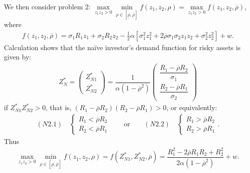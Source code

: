 \documentclass[10pt]{article}
\begin{document}
We then consider problem 2: $ \max\limits_{z_1 z_2 > 0} \min\limits_{\rho \in [\underline{\rho}, \overline{\rho}]} f (z_1, z_2, \rho) = \max\limits_{z_1 z_2 > 0} f (z_1, z_2, \overline{\rho}) $, where
\begin{eqnarray*}
f (z_1, z_2, \overline{\rho}) = \sigma_1 R_1 z_1 + \sigma_2 R_2 z_2 - \frac12 \alpha [\sigma_1^2 z_1^2 + 2 \overline{\rho} \sigma_1 \sigma_2 z_1 z_2 + \sigma_2^2 z_2^2] + w.
\end{eqnarray*}
Calculation shows that the na\"ive investor's demand function for risky assets is given by:
\begin{eqnarray}
Z_N^* = \left( \begin{matrix} Z_{N 1}^* \\ Z_{N 2}^* \end{matrix} \right) = \dfrac1{\alpha (1 - \overline{\rho}^2)} \left( \begin{matrix} \dfrac{R_1 - \overline{\rho} R_2}{\sigma_1} \\ \dfrac{R_2 - \overline{\rho} R_1}{\sigma_2} \end{matrix} \right)
\end{eqnarray}
if $ Z_{N 1}^* Z_{N 2}^* > 0 $, that is, $ (R_1 - \overline{\rho} R_2) (R_2 - \overline{\rho} R_1) > 0 $, or equivalently:
\begin{eqnarray}
(N2.1) \quad \left\{ \begin{matrix} R_1 < \overline{\rho} R_2 \\ R_2 < \overline{\rho} R_1 \end{matrix} \right. \qquad \text{or} \qquad (N2.2) \quad \left\{ \begin{matrix} R_1 > \overline{\rho} R_2 \\ R_2 > \overline{\rho} R_1 \end{matrix} \right..
\end{eqnarray}
Thus
\begin{eqnarray*}
\max\limits_{z_1 z_2 > 0} \min\limits_{\rho \in [\underline{\rho}, \overline{\rho}]} f (z_1, z_2, \rho) = f (Z_{N 1}^*, Z_{N 2}^*, \overline{\rho}) = \dfrac{R_1^2 - 2 \overline{\rho} R_1 R_2 + R_2^2}{2 \alpha (1 - \overline{\rho}^2)} + w.
\end{eqnarray*}
\end{document}
